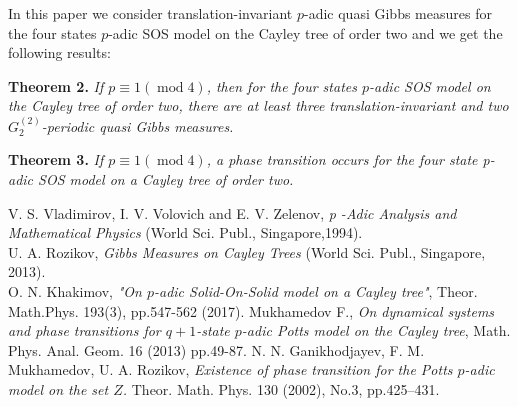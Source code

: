 \documentclass[12pt]{llncs}
\begin{document}
In this paper we consider translation-invariant $p$-adic quasi Gibbs measures for the four states $p$-adic SOS model on the Cayley tree of order two and we get the following results:

\textbf{Theorem 2.} \label{TR_2}
\emph{If $p\equiv 1 (\operatorname{mod }4)$, then for the four states $p$-adic  SOS model on the Cayley tree of order two,
there are at least three translation-invariant and two $G^{(2)}_2$-periodic quasi Gibbs measures.}

\textbf{Theorem 3.} \label{phase tra_2}
\emph{If $p\equiv 1 (\operatorname{mod }4)$, a phase transition occurs for the four state p-adic SOS model on a Cayley tree of order two.}

\begin{thebibliography}{9} %
 V. S. Vladimirov, I. V. Volovich and E. V. Zelenov, \textsl{p -Adic Analysis and Mathematical Physics} (World Sci. Publ., Singapore,1994).\\
  U. A. Rozikov, \textsl{Gibbs Measures on Cayley Trees} (World Sci. Publ., Singapore, 2013).\\
  O. N. Khakimov, \textsl{"On $p$-adic Solid-On-Solid model on a Cayley tree"}, Theor. Math.Phys. 193(3), pp.547-562 (2017).
 Mukhamedov F., \textsl{On dynamical systems and phase
transitions for $q+1$-state $p$-adic Potts model on the Cayley tree},
Math. Phys. Anal. Geom. 16 (2013) pp.49-87.
 N. N. Ganikhodjayev, F. M. Mukhamedov, U. A. Rozikov, \textsl{Existence
of phase transition for the Potts $p$-adic model on the set $Z$.}
 Theor. Math. Phys.  130 (2002), No.3, pp.425--431.

\end{thebibliography}

\end{document}
